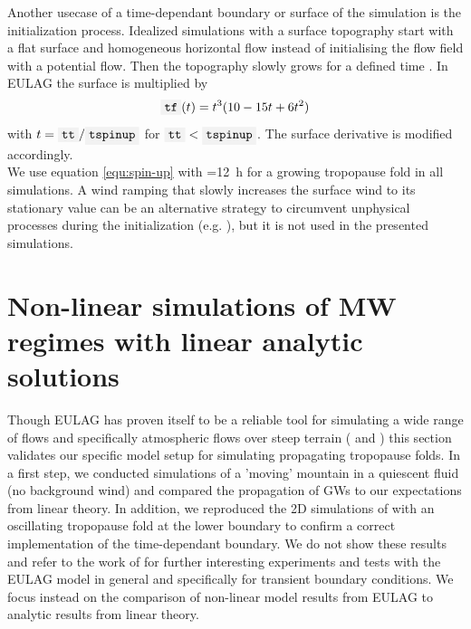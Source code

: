 Another usecase of a time-dependant boundary or surface of the simulation is the initialization process. Idealized simulations with a surface topography start with a flat surface and homogeneous horizontal flow instead of initialising the flow field with a potential flow. Then the topography slowly grows for a defined time . In EULAG the surface  is multiplied by
\begin{equation}
    \code{tf}(t) = t^3 (10 - 15t + 6t^2)
    \label{equ:spin-up}
\end{equation}
with $t = \code{tt} / \code{tspinup}$ for $\code{tt} < \code{tspinup}$. The surface derivative  is modified accordingly. \\
We use equation \ref{equ:spin-up} with =\SI{12}{\hour} for a growing tropopause fold in all simulations. A wind ramping that slowly increases the surface wind to its stationary value can be an alternative strategy to circumvent unphysical processes during the initialization (e.g. \cite[]{mixa_nonlinear_2021}), but it is not used in the presented simulations.

\section{Non-linear simulations of MW regimes with linear analytic solutions}
\label{sec:linear-MWs}
Though EULAG has proven itself to be a reliable tool for simulating a wide range of flows and specifically atmospheric flows over steep terrain (\cite{prusa_eulag_2008} and \cite{doyle_intercomparison_2011}) this section validates our specific model setup for simulating propagating tropopause folds. In a first step, we conducted simulations of a 'moving' mountain in a quiescent fluid (no background wind) and compared the propagation of GWs to our expectations from linear theory. In addition, we reproduced the 2D simulations of \textcite[]{prusa_all-scale_2003} with an oscillating tropopause fold at the lower boundary to confirm a correct implementation of the time-dependant boundary. We do not show these results and refer to the work of \textcite{grogger_simulation_2022} for further interesting experiments and tests with the EULAG model in general and specifically for transient boundary conditions. We focus instead on the comparison of non-linear model results from EULAG to analytic results from linear theory. 

